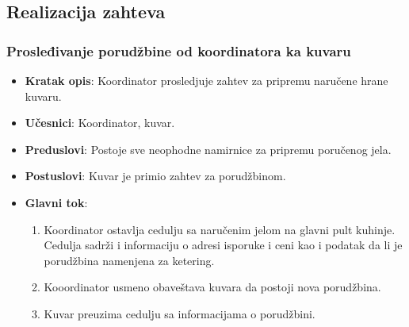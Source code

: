 \newpage
\subsection{Realizacija zahteva}
\subsubsection{Prosleđivanje porudžbine od koordinatora ka kuvaru}
\begin{itemize}
    \item \textbf{Kratak opis}:
    Koordinator prosledjuje zahtev za pripremu naručene hrane kuvaru.
    \item \textbf{Učesnici}:
    Koordinator, kuvar.
    \item \textbf{Preduslovi}:
    Postoje sve neophodne namirnice za pripremu poručenog jela.
    \item \textbf{Postuslovi}:
    Kuvar je primio zahtev za porudžbinom.
    \item \textbf{Glavni tok}:
   \begin{enumerate}
        \item Koordinator ostavlja cedulju sa naručenim jelom na glavni pult kuhinje. Cedulja sadrži i informaciju o adresi isporuke i ceni kao i podatak da li je porudžbina namenjena za ketering.
        \item Kooordinator usmeno obaveštava kuvara da postoji nova porudžbina.
        \item Kuvar preuzima cedulju sa informacijama o porudžbini.
\end{enumerate}
\end{itemize}

